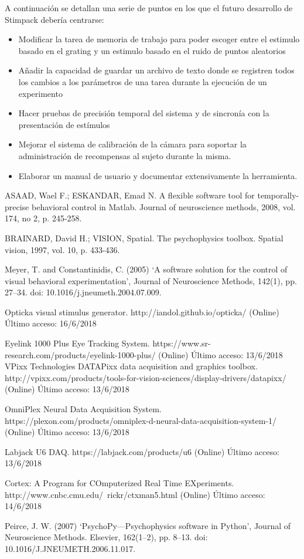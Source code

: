 \documentclass[conference]{IEEEtran}
\begin{document}
A continuación se detallan una serie de puntos en los que el futuro desarrollo de Stimpack debería centrarse:

\begin{itemize}
	\item Modificar la tarea de memoria de trabajo para poder escoger entre el estimulo basado en el grating y un estimulo basado en el ruido de puntos aleatorios
	\item Añadir la capacidad de guardar un archivo de texto donde se registren todos los cambios a los parámetros de una tarea durante la ejecución de un experimento
	\item Hacer pruebas de precisión temporal del sistema y de sincronía con la presentación de estímulos
	\item Mejorar el sistema de calibración de la cámara para soportar la administración de recompensas al sujeto durante la misma.
	\item Elaborar un manual de usuario y documentar extensivamente la herramienta.

\end{itemize}


\begin{thebibliography}{00}
ASAAD, Wael F.; ESKANDAR, Emad N. A flexible software tool for temporally-precise behavioral control in Matlab. Journal of neuroscience methods, 2008, vol. 174, no 2, p. 245-258.

 BRAINARD, David H.; VISION, Spatial. The psychophysics toolbox. Spatial vision, 1997, vol. 10, p. 433-436.

 Meyer, T. and Constantinidis, C. (2005) ‘A software solution for the control of visual behavioral experimentation’, Journal of Neuroscience Methods, 142(1), pp. 27–34. doi: 10.1016/j.jneumeth.2004.07.009.

 Opticka visual stimulus generator. http://iandol.github.io/opticka/ (Online) Último acceso: 16/6/2018

 Eyelink 1000 Plus Eye Tracking System. https://www.sr-research.com/products/eyelink-1000-plus/ (Online) Último acceso: 13/6/2018
 VPixx Technologies DATAPixx data acquisition and graphics toolbox. http://vpixx.com/products/tools-for-vision-sciences/display-drivers/datapixx/  (Online) Último acceso: 13/6/2018

 OmniPlex Neural Data Acquisition System. https://plexon.com/products/omniplex-d-neural-data-acquisition-system-1/ (Online) Último acceso: 13/6/2018

 Labjack U6 DAQ. https://labjack.com/products/u6 (Online) Último acceso: 13/6/2018

 Cortex: A Program for COmputerized Real Time EXperiments. http://www.cnbc.cmu.edu/~rickr/ctxman5.html (Online) Último acceso: 14/6/2018

 Peirce, J. W. (2007) ‘PsychoPy—Psychophysics software in Python’, Journal of Neuroscience Methods. Elsevier, 162(1–2), pp. 8–13. doi: 10.1016/J.JNEUMETH.2006.11.017.

\end{thebibliography}
\vspace{12pt}
\end{document}
